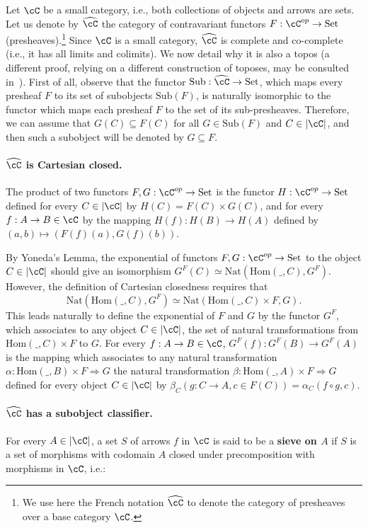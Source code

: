 \documentclass[preprint,3p,times]{elsarticle}
\newcommand{\Set}{\mathrm{Set}}
\newcommand{\Sub}{\mathrm{Sub}}
\newcommand{\Hom}{\mathrm{Hom}}
\newcommand{\nat}{\mathrm{Nat}}
\begin{document}
Let $\cC$ be a small category, i.e., both collections of objects and arrows are sets. Let us denote by $\widehat{\cC}$ the category of contravariant functors $F : \cC^{op} \to \Set$ (presheaves).\footnote{We use here the French notation $\widehat{\cC}$ to denote the category of presheaves over a base category $\cC$.} Since $\cC$ is a small category, $\widehat{\cC}$ is complete and co-complete (i.e., it has all limits and colimits). We now detail why it is also a topos (a different proof, relying on a different construction of toposes, may be consulted in~\cite[Section 2.1, Theorem 4]{BW85}). First of all, observe that the functor $\Sub : \widehat{\cC} \to \Set$, which maps every presheaf $F$ to its set of subobjects $\Sub(F)$, is naturally isomorphic to the functor which maps each presheaf $F$ to the set of its sub-presheaves. Therefore, we can assume that $G(C) \subseteq F(C)$ for all $G \in \Sub(F)$ and $C \in |\cC|$, and then such a subobject will be denoted by $G \subseteq F$.

\paragraph{$\widehat{\cC}$ is Cartesian closed.} The product of two functors $F ,G : \cC^{op} \to \Set$ is the functor $H : \cC^{op} \to \Set$ defined for every $C \in |\cC|$ by $H(C) = F(C) \times G(C)$, and for every $f : A \to B \in \cC$ by the mapping $H(f) : H(B) \to H(A)$ defined by {$(a,b) \mapsto (F(f)(a),G(f)(b))$}. 

By Yoneda's Lemma, the exponential of functors $F,G : \cC^{op} \to \Set$ to the object $C \in |\cC|$ should give an isomorphism $G^F(C) \simeq \nat(\Hom(\_,C),G^F)$. However, the definition of Cartesian closedness requires that 
\[
\nat(\Hom(\_,C),G^F) \simeq \nat(\Hom(\_,C) \times F,G).
\] 
This leads naturally to define the exponential of $F$ and $G$ by the functor $G^F$, which associates to any object $C \in |\cC|$, the set of natural transformations from $\Hom(\_,C) \times F$ to $G$. For every $f : A \to B \in \cC$, $G^F(f) : G^F(B) \to G^F(A)$ is the mapping which associates to any natural transformation $\alpha : \Hom(\_,B) \times F \Rightarrow G$ the natural transformation $\beta : \Hom(\_,A) \times F \Rightarrow G$ defined for every object $C \in |\cC|$ by $\beta_C(g : C \to A,c \in F(C)) = \alpha_C(f \circ g,c)$.

\paragraph{$\widehat{\cC}$ has a subobject classifier.} For every $A \in |\cC|$, a set $S$ of arrows $f$ in $\cC$ is said to be a \textbf{sieve on $A$} if $S$ is a set of morphisms with codomain $A$ closed under precomposition with morphisms in $\cC$, i.e.:
\end{document}
